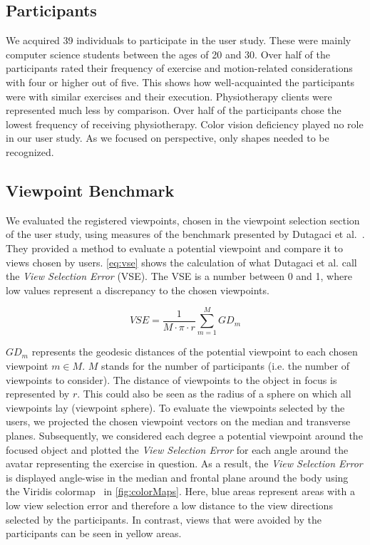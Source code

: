 \subsection{Participants \label{sec:participants}}
We acquired 39 individuals to participate in the user study. These were mainly computer science students between the ages of 20 and 30. Over half of the participants rated their frequency of exercise and motion-related considerations with four or higher out of five. This shows how well-acquainted the participants were with similar exercises and their execution. Physiotherapy clients were represented much less by comparison. Over half of the participants chose the lowest frequency of receiving physiotherapy. Color vision deficiency played no role in our user study. As we focused on perspective, only shapes needed to be recognized.

\subsection{Viewpoint Benchmark \label{sec:benchmark}}
We evaluated the registered viewpoints, chosen in the viewpoint selection section of the user study, using measures of the benchmark presented by Dutagaci et al.~\cite{dutagaci2010bbv}. They provided a method to evaluate a potential viewpoint and compare it to views chosen by users. \autoref{eq:vse} shows the calculation of what Dutagaci et al. call the \emph{View Selection Error} (VSE). The VSE is a number between 0 and 1, where low values represent a discrepancy to the chosen viewpoints.

\begin{equation}
	\label{eq:vse}
	VSE = \frac{1}{M \cdot \pi \cdot r}\sum_{m=1}^{M} GD_{m}
\end{equation}

\(GD_m\) represents the geodesic distances of the potential viewpoint to each chosen viewpoint \(m \in M\). $M$ stands for the number of participants (i.e. the number of viewpoints to consider). The distance of viewpoints to the object in focus is represented by \(r\). This could also be seen as the radius of a sphere on which all viewpoints lay (viewpoint sphere). To evaluate the viewpoints selected by the users, we projected the chosen viewpoint vectors on the median and transverse planes. Subsequently, we considered each degree a potential viewpoint around the focused object and plotted the \emph{View Selection Error} for each angle around the avatar representing the exercise in question. As a result, the \emph{View Selection Error} is displayed angle-wise in the median and frontal plane around the body using the Viridis colormap~\cite{viridis} in \autoref{fig:colorMaps}. Here, blue areas represent areas with a low view selection error and therefore a low distance to the view directions selected by the participants. In contrast, views that were avoided by the participants can be seen in yellow areas.


